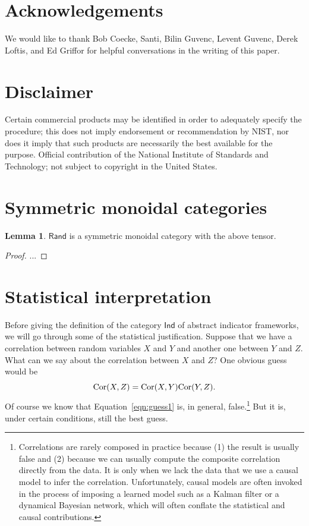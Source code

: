 \documentclass{article}
\theoremstyle{definition}
\newtheorem{lemma}[theorem]{Lemma}
\newcommand{\Cat}[1]{\mathsf{#1}}
\def\Ind{\Cat{Ind}}
\def\Rand{\Cat{Rand}}
\def\Cor{\textnormal{Cor}}
\begin{document}

\section*{Acknowledgements}
We would like to thank Bob Coecke, Santi, Bilin Guvenc, Levent Guvenc, Derek Loftis, and Ed Griffor for helpful conversations in the writing of this paper.

\section*{Disclaimer}
Certain commercial products may be identified in order to adequately specify the procedure; this does not imply endorsement or recommendation by NIST, nor does it imply that such products are necessarily the best available for the purpose. Official contribution of the National Institute of Standards and Technology; not subject to copyright in the United States.

\appendix
\section{Symmetric monoidal categories}
\begin{lemma}\label{lem:rand_tensor}
$\Rand$ is a symmetric monoidal category with the above tensor.
\end{lemma}
\begin{proof}
...
\end{proof}

\section{Statistical interpretation}
Before giving the definition of the category $\Ind$ of abstract indicator frameworks, we will go through some of the statistical justification. Suppose that we have a correlation between random variables $X$ and $Y$ and another one between $Y$ and $Z$. What can we say about the correlation between $X$ and $Z$? One obvious guess would be 
\begin{equation}\label{eqn:guess1}\Cor(X,Z) = \Cor(X,Y)\Cor(Y,Z).\end{equation}
Of course we know that Equation~\ref{eqn:guess1} is, in general, false.\footnote{Correlations are rarely composed in practice because (1) the result is usually false and (2) because we can usually compute the composite correlation directly from the data. It is only when we lack the data that we use a causal model to infer the correlation. Unfortunately, causal models are often invoked in the process of imposing a learned model such as a Kalman filter or a dynamical Bayesian network, which will often conflate the statistical and causal contributions.} But it is, under certain conditions, still the best guess. 
\end{document}
